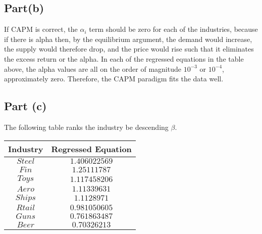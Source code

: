 \documentclass[12pt]{article}
\begin{document}
	\subsection{Part(b)}
	
		If CAPM is correct, the $\alpha_{i}$ term should be zero for each of the industries, because if there is alpha then, by the equilibrium argument, the 
		demand would increase, the supply would therefore drop, and the price would rise such that it eliminates the excess return or the alpha. In each of the 
		regressed equations in the table above, the alpha values are all on the order of magnitude $10^{-3}$ or $10^{-4}$, approximately zero. Therefore, 
		the CAPM paradigm fits the data well. 
		\newpage
	\subsection{Part (c)}
	
		The following table ranks the industry be descending $\beta$. 
		\begin{center}
 		\begin{tabular}{||c c||} 
 		\hline
 		 Industry &  Regressed Equation \\ [0.5ex] 
 		\hline \hline
 		$Steel$ & $1.406022569$  \\ 
 		\hline
 		$Fin$ & $1.25111787$ \\
 		\hline
 		$Toys$ & $1.117458206$  \\
 		\hline
 		$Aero$ & $1.11339631$  \\
 		\hline
 		$Ships$ & $1.1128971$  \\
 		\hline
 		$Rtail$ & $0.981050605$ \\
 		\hline
 		$Guns$ & $0.761863487$ \\
 		\hline
 		$Beer$ & $0.70326213$ \\ 
 		\hline
		\end{tabular}
		\end{center}
		 
		
			
	
	
\end{document}
